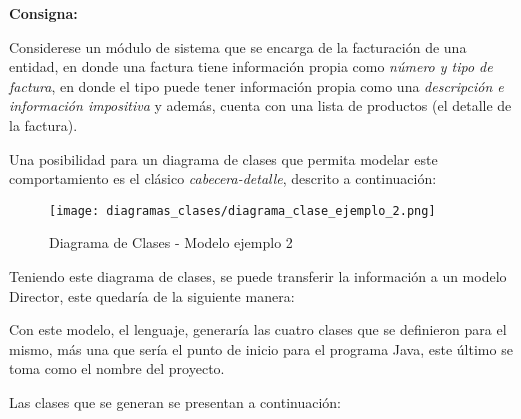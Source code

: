 \textbf{Consigna:}
\begin{displayquote}
	Considerese un módulo de sistema que se encarga de la facturación de
	una entidad, en donde una factura tiene información propia como \textit{número
	y tipo de factura}, en donde el tipo puede tener información propia como una
	\textit{descripción e información impositiva} y además, cuenta con una lista
	de productos (el detalle de la factura).
\end{displayquote}

Una posibilidad para un diagrama de clases que permita modelar este
comportamiento es el clásico \textit{cabecera-detalle}, descrito a
continuación:

\begin{figure}[H]
	\centering
	\texttt{[image: diagramas\_clases/diagrama\_clase\_ejemplo\_2.png]}
	\caption{Diagrama de Clases - Modelo ejemplo 2}
	\label{fig:dc_mod_ej_2}
\end{figure}

Teniendo este diagrama de clases, se puede transferir la información a un modelo
Director, este quedaría de la siguiente manera:



Con este modelo, el lenguaje, generaría las cuatro clases que se definieron
para el mismo, más una que sería el punto de inicio para el programa Java, este
último se toma como el nombre del proyecto.

Las clases que se generan se presentan a continuación:









